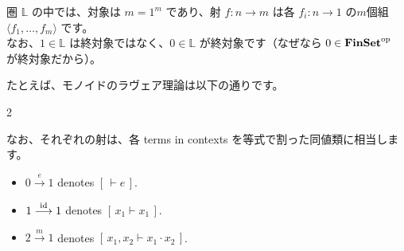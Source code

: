 \documentclass[
		head_space=20mm,
		foot_space=20mm,
		gutter=10mm,
		line_length=190mm
]{jlreq}
\begin{document}
\begin{remark}
	圏 $\mathbb L$ の中では、対象は $m=1^m$ であり、射 $f:n\to m$ は各 $f_i:n\to 1$ の$m$個組 $\langle f_1,\dots,f_m\rangle$ です。\\ なお、$1\in\mathbb L$ は終対象ではなく、$0\in\mathbb L$ が終対象です（なぜなら $0\in\mathbf{FinSet}^{\mathrm{op}}$ が終対象だから）。
\end{remark}

\noindent たとえば、モノイドのラヴェア理論は以下の通りです。
\begin{multicols}{2}
	\begin{center}
	\end{center}
	\begin{center}
	\end{center}
\end{multicols}
\noindent なお、それぞれの射は、各 terms in contexts を等式で割った同値類に相当します。
\begin{itemize}
	\item $0\overset{e}\longrightarrow 1$ denotes $[\,\vdash e\,]$. 
	\item $1\overset{\mathrm{id}}\longrightarrow 1$ denotes $[\,x_1\vdash x_1\,]$.
	\item $2\overset{m}\longrightarrow 1$ denotes $[\,x_1,x_2\vdash x_1\cdot x_2\,]$.
\end{itemize}

\clearpage
\end{document}
